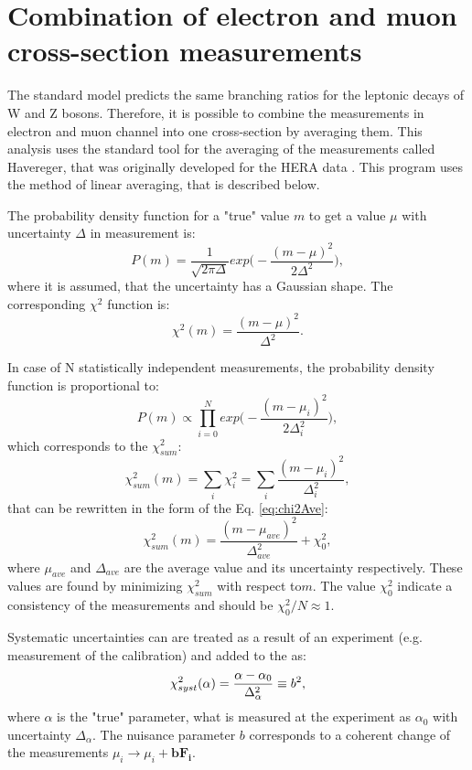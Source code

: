 \section{Combination of electron and muon cross-section measurements}\label{sec:Aver}

The standard model predicts the same branching ratios for the leptonic decays of W and Z bosons. Therefore, it is possible to combine the measurements in electron and muon channel into one cross-section by averaging them. This analysis uses the standard tool for the averaging of the measurements called Havereger, that was originally developed  for the HERA data \cite{HERADIS}. This program uses the method of linear averaging, that is described below.

The probability density function for a "true" value $m$ to get a value $\mu$ with uncertainty $\Delta$ in measurement is:
\begin{equation}
P(m)=\frac{1}{\sqrt{2\pi\Delta}}exp\Big(-\frac{(m-\mu)^2}{2\Delta^2}\Big),
\end{equation}
where it is assumed, that the uncertainty has a Gaussian shape. The corresponding $\chi^2$ function is:
\begin{equation}\label{eq:chi2Ave}
\chi^2(m) = \frac{(m-\mu)^2}{\Delta^2}.
\end{equation}

In case of N statistically independent measurements, the probability density function is proportional to:
\begin{equation}
P(m)\propto \prod_{i=0}^{N} exp\Big(-\frac{(m-\mu_i)^2}{2\Delta_i^2}\Big),
\end{equation}
which corresponds to the $\chi_{sum}^2$:
\begin{equation}
\chi_{sum}^2(m) = \sum_{i} \chi^2_i = \sum_{i} \frac{(m-\mu_i)^2}{\Delta_i^2}, 
\end{equation}
that can be rewritten in the form of the Eq. \ref{eq:chi2Ave}:
\begin{equation}\label{eq:chi2Sum}
\chi_{sum}^2(m) =\frac{(m-\mu_{ave})^2}{\Delta_{ave}^2}+\chi^{2}_{0}, 
\end{equation}
where $\mu_{ave}$ and $\Delta_{ave}$ are the average value and its uncertainty respectively.  These values are found by minimizing $\chi^{2}_{sum}$ with respect to$m$.  The value $\chi^2_0$ indicate a consistency of the measurements and should be $\chi^2_0/N \approx 1$.

Systematic uncertainties can are treated as a result of an experiment (e.g. measurement of the calibration) and added to the \chiD as:
\begin{equation}
\chi^2_{syst}(\alpha) = \frac{\alpha-\alpha_0}{\Delta_{\alpha}^2}\equiv b^2,
\end{equation}
where $\alpha$ is the "true" parameter, what is measured at the experiment as $\alpha_0$ with uncertainty $\Delta_{\alpha}$. The nuisance parameter $b$ corresponds to a coherent change of the measurements $\mu_i \to \mu_i+\mathbf{bF_i}$. 

